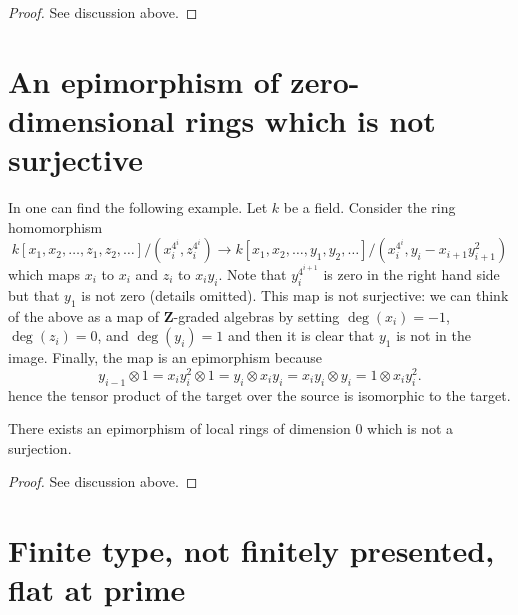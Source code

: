 \begin{proof}
See discussion above.
\end{proof}








\section{An epimorphism of zero-dimensional rings which is not surjective}
\label{section-epimorphism-not-surjective}

\noindent
In \cite{Autour} one can find the following example.
Let $k$ be a field. Consider the ring homomorphism
$$
k[x_1, x_2, \ldots, z_1, z_2, \ldots]/
(x_i^{4^i}, z_i^{4^i})
\longrightarrow
k[x_1, x_2, \ldots, y_1, y_2, \ldots]/
(x_i^{4^i}, y_i - x_{i + 1}y_{i + 1}^2)
$$
which maps $x_i$ to $x_i$ and $z_i$ to $x_iy_i$. Note that $y_i^{4^{i + 1}}$
is zero in the right hand side but that $y_1$ is not zero (details omitted).
This map is not surjective: we can think of the above as a map of
$\mathbf{Z}$-graded algebras by setting $\deg(x_i) = -1$, $\deg(z_i) = 0$,
and $\deg(y_i) = 1$ and then it is clear that $y_1$ is not in the image.
Finally, the map is an epimorphism because
$$
y_{i - 1} \otimes 1 = x_i y_i^2 \otimes 1 = y_i \otimes x_i y_i =
x_i y_i \otimes y_i = 1 \otimes x_i y_i^2.
$$
hence the tensor product of the target over the source is isomorphic
to the target.

\begin{lemma}
\label{lemma-epi-not-surjective}
There exists an epimorphism of local rings of dimension $0$
which is not a surjection.
\end{lemma}

\begin{proof}
See discussion above.
\end{proof}



\section{Finite type, not finitely presented, flat at prime}
\label{section-ft-not-fp-flat-at-prime}


